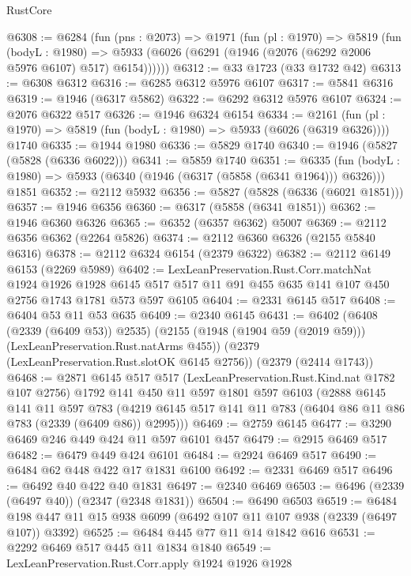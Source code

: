 \begin{lexlean}{RustCore}
\begin{coremodule}
@6308 := @6284
    (fun (pns : @2073) =>
    @1971
      (fun (pl : @1970) =>
      @5819
        (fun (bodyL : @1980) =>
        @5933 (@6026 (@6291 (@1946 (@2076 (@6292 @2006 @5976 @6107) @517) @6154))))))
@6312 := @33 @1723 (@33 @1732 @42)
@6313 := @6308 @6312
@6316 := @6285 @6312 @5976 @6107
@6317 := @5841 @6316
@6319 := @1946 (@6317 @5862)
@6322 := @6292 @6312 @5976 @6107
@6324 := @2076 @6322 @517
@6326 := @1946 @6324 @6154
@6334 := @2161
    (fun (pl : @1970) => @5819 (fun (bodyL : @1980) => @5933 (@6026 (@6319 @6326))))
    @1740
@6335 := @1944 @1980
@6336 := @5829 @1740
@6340 := @1946 (@5827 (@5828 (@6336 @6022)))
@6341 := @5859 @1740
@6351 := @6335
    (fun (bodyL : @1980) => @5933 (@6340 (@1946 (@6317 (@5858 (@6341 @1964))) @6326)))
    @1851
@6352 := @2112 @5932
@6356 := @5827 (@5828 (@6336 (@6021 @1851)))
@6357 := @1946 @6356
@6360 := @6317 (@5858 (@6341 @1851))
@6362 := @1946 @6360 @6326
@6365 := @6352 (@6357 @6362) @5007
@6369 := @2112 @6356 @6362 (@2264 @5826)
@6374 := @2112 @6360 @6326 (@2155 @5840 @6316)
@6378 := @2112 @6324 @6154 (@2379 @6322)
@6382 := @2112 @6149 @6153 (@2269 @5989)
@6402 := LexLeanPreservation.Rust.Corr.matchNat
    @1924
    @1926
    @1928
    @6145
    @517
    @517
    @11
    @91
    @455
    @635
    @141
    @107
    @450
    @2756
    @1743
    @1781
    @573
    @597
    @6105
@6404 := @2331 @6145 @517
@6408 := @6404 @53 @11 @53 @635
@6409 := @2340 @6145
@6431 := @6402
    (@6408 (@2339 (@6409 @53)) @2535)
    (@2155 (@1948 (@1904 @59 (@2019 @59))) (LexLeanPreservation.Rust.natArms @455))
    (@2379 (LexLeanPreservation.Rust.slotOK @6145 @2756))
    (@2379 (@2414 @1743))
@6468 := @2871
    @6145
    @517
    @517
    (LexLeanPreservation.Rust.Kind.nat @1782 @107 @2756)
    @1792
    @141
    @450
    @11
    @597
    @1801
    @597
    @6103
    (@2888
      @6145
      @141
      @11
      @597
      @783
      (@4219 @6145 @517 @141 @11 @783 (@6404 @86 @11 @86 @783 (@2339 (@6409 @86)) @2995)))
@6469 := @2759 @6145
@6477 := @3290 @6469 @246 @449 @424 @11 @597 @6101 @457
@6479 := @2915 @6469 @517
@6482 := @6479 @449 @424 @6101
@6484 := @2924 @6469 @517
@6490 := @6484 @62 @448 @422 @17 @1831 @6100
@6492 := @2331 @6469 @517
@6496 := @6492 @40 @422 @40 @1831
@6497 := @2340 @6469
@6503 := @6496 (@2339 (@6497 @40)) (@2347 (@2348 @1831))
@6504 := @6490 @6503
@6519 := @6484 @198 @447 @11 @15 @938 @6099 (@6492 @107 @11 @107 @938 (@2339 (@6497 @107)) @3392)
@6525 := @6484 @445 @77 @11 @14 @1842 @616
@6531 := @2292 @6469 @517 @445 @11 @1834 @1840
@6549 := LexLeanPreservation.Rust.Corr.apply
    @1924
    @1926
    @1928

\end{coremodule}
\end{lexlean}
